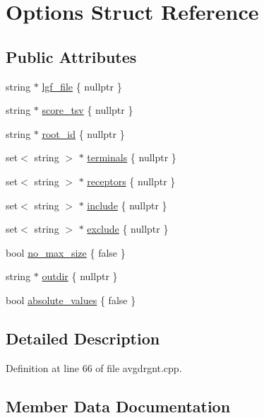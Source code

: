 \hypertarget{structOptions}{}\section{Options Struct Reference}
\label{structOptions}
\subsection*{Public Attributes}
\begin{DoxyCompactItemize}
\item 
string $\ast$ \hyperlink{structOptions_ab1d4dd586f45745c976ef7fcd2536221}{lgf\+\_\+file} \{ nullptr \}
\item 
string $\ast$ \hyperlink{structOptions_a1f2fa7263f58ae203aa79f71b4a26540}{score\+\_\+tsv} \{ nullptr \}
\item 
string $\ast$ \hyperlink{structOptions_a7df263753dc02f88a187ed119f3f8c37}{root\+\_\+id} \{ nullptr \}
\item 
set$<$ string $>$ $\ast$ \hyperlink{structOptions_a50e99d4f8be4e78eea581ea9378d3b4a}{terminals} \{ nullptr \}
\item 
set$<$ string $>$ $\ast$ \hyperlink{structOptions_a4192410864fec99db1eea65c8d8dfb52}{receptors} \{ nullptr \}
\item 
set$<$ string $>$ $\ast$ \hyperlink{structOptions_a90ea5ea52a8010baead4fa1c9b587b6f}{include} \{ nullptr \}
\item 
set$<$ string $>$ $\ast$ \hyperlink{structOptions_a0b4e7353a06f655fb83a2402ed52ecd0}{exclude} \{ nullptr \}
\item 
bool \hyperlink{structOptions_a8ad3707dd08d31b9084188a549126644}{no\+\_\+max\+\_\+size} \{ false \}
\item 
string $\ast$ \hyperlink{structOptions_a80746ce696086f5fb130d798849d0277}{outdir} \{ nullptr \}
\item 
bool \hyperlink{structOptions_a86e7be53c40b22db67261e2c34282736}{absolute\+\_\+values} \{ false \}
\end{DoxyCompactItemize}


\subsection{Detailed Description}


Definition at line 66 of file avgdrgnt.\+cpp.



\subsection{Member Data Documentation}
